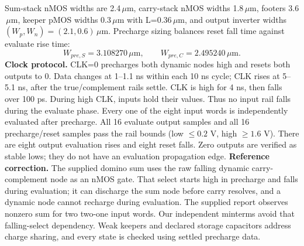\documentclass[11pt,a4paper]{article}
\begin{document}
Sum-stack nMOS widths are 2.4$\,\mu$m, carry-stack nMOS widths 1.8$\,\mu$m, footers 3.6$\,\mu$m, keeper pMOS widths 0.3$\,\mu$m with L=0.36$\,\mu$m, and output inverter widths $(W_p,W_n)=(2.1,0.6)\,\mu$m. Precharge sizing balances reset fall time against evaluate rise time:
\[
 W_{pre,S}=3.108270\,\mu\mathrm m,\qquad
 W_{pre,C}=2.495240\,\mu\mathrm m.
\]
\textbf{Clock protocol.} CLK=0 precharges both dynamic nodes high and resets both outputs to 0. Data changes at 1--1.1 ns within each 10 ns cycle; CLK rises at 5--5.1 ns, after the true/complement rails settle. CLK is high for 4 ns, then falls over 100 ps. During high CLK, inputs hold their values. Thus no input rail falls during the evaluate phase.
Every one of the eight input words is independently evaluated after precharge. All 16 evaluate output samples and all 16 precharge/reset samples pass the rail bounds (low $\le 0.2$ V, high $\ge 1.6$ V). There are eight output evaluation rises and eight reset falls. Zero outputs are verified as stable lows; they do not have an evaluation propagation edge.
\textbf{Reference correction.} The supplied domino sum uses the raw falling dynamic carry-complement node as an nMOS gate. That select starts high in precharge and falls during evaluation; it can discharge the sum node before carry resolves, and a dynamic node cannot recharge during evaluation. The supplied report observes nonzero sum for two two-one input words. Our independent minterms avoid that falling-select dependency. Weak keepers and declared storage capacitors address charge sharing, and every state is checked using settled precharge data.
\newpage
\end{document}
